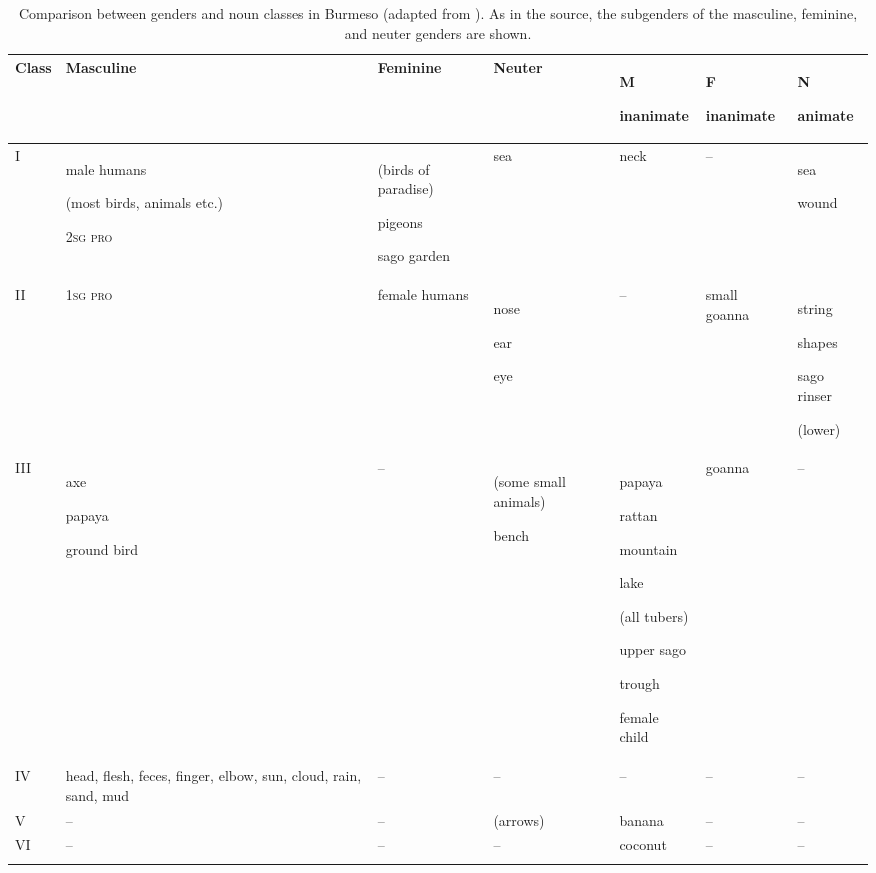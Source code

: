\documentclass[output=collectionpaper]{langsci/langscibook}
\begin{document}
\begin{table}
\small
\begin{tabularx}{\textwidth}{lQQQQQQ}
\lsptoprule

Class & Masculine & Feminine & Neuter & {M}

inanimate & {F}

inanimate & {N}

animate\\
\midrule
I & {male humans}

{(most birds, animals etc.)}

\textsc{2sg pro} & {(birds of paradise)}

{pigeons}

sago garden & sea & neck & – & {sea}

wound\\
II & \textsc{1sg pro} & female humans & {nose}

{ear}

eye & – & small goanna & {string}

{shapes}

{sago rinser}

(lower)\\
III & {axe}

{papaya}

ground bird & – & {(some small animals)}

bench & {papaya}

{rattan}

{mountain}

{lake}

{(all tubers)}

{upper sago}

{trough}

female child & goanna & –\\
IV & head, flesh, feces, finger, elbow, sun, cloud, rain, sand, mud & – & – & – & – & –\\
V & – & – & (arrows) & banana & – & –\\
VI & – & – & – & coconut & – & –\\
\lspbottomrule
\end{tabularx}
\caption{Comparison between genders and noun classes in Burmeso (adapted from \citealt[108]{Donohue2001}). As in the source, the subgenders of the masculine, feminine, and neuter genders are shown.}
\label{tab:Svard:15}
\end{table}
\end{document}

